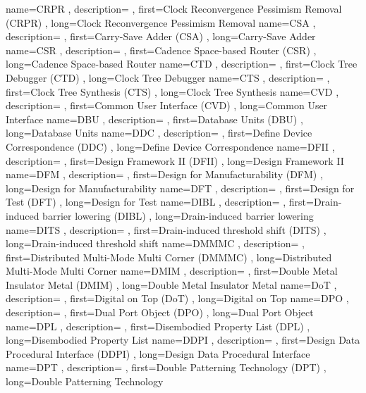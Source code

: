 { name={CRPR}
, description={}
, first={Clock Reconvergence Pessimism Removal (CRPR)}
, long={Clock Reconvergence Pessimism Removal}
}
{ name={CSA}
, description={}
, first={Carry-Save Adder (CSA)}
, long={Carry-Save Adder}
}
{ name={CSR}
, description={}
, first={Cadence Space-based Router (CSR)}
, long={Cadence Space-based Router}
}
{ name={CTD}
, description={}
, first={Clock Tree Debugger (CTD)}
, long={Clock Tree Debugger}
}
{ name={CTS}
, description={}
, first={Clock Tree Synthesis (CTS)}
, long={Clock Tree Synthesis}
}
{ name={CVD}
, description={}
, first={Common User Interface (CVD)}
, long={Common User Interface}
}
{ name={DBU}
, description={}
, first={Database Units (DBU)}
, long={Database Units}
}
{ name={DDC}
, description={}
, first={Define Device Correspondence (DDC)}
, long={Define Device Correspondence}
}
{ name={DFII}
, description={}
, first={Design Framework II (DFII)}
, long={Design Framework II}
}
{ name={DFM}
, description={}
, first={Design for Manufacturability (DFM)}
, long={Design for Manufacturability}
}
{ name={DFT}
, description={}
, first={Design for Test (DFT)}
, long={Design for Test}
}
{ name={DIBL}
, description={}
, first={Drain-induced barrier lowering (DIBL)}
, long={Drain-induced barrier lowering}
}
{ name={DITS}
, description={}
, first={Drain-induced threshold shift (DITS)}
, long={Drain-induced threshold shift}
}
{ name={DMMMC}
, description={}
, first={Distributed Multi-Mode Multi Corner (DMMMC)}
, long={Distributed Multi-Mode Multi Corner}
}
{ name={DMIM}
, description={}
, first={Double Metal Insulator Metal (DMIM)}
, long={Double Metal Insulator Metal}
}
{ name={DoT}
, description={}
, first={Digital on Top (DoT)}
, long={Digital on Top}
}
{ name={DPO}
, description={}
, first={Dual Port Object (DPO)}
, long={Dual Port Object}
}
{ name={DPL}
, description={}
, first={Disembodied Property List (DPL)}
, long={Disembodied Property List}
}
{ name={DDPI}
, description={}
, first={Design Data Procedural Interface (DDPI)}
, long={Design Data Procedural Interface}
}
{ name={DPT}
, description={}
, first={Double Patterning Technology (DPT)}
, long={Double Patterning Technology}
}
